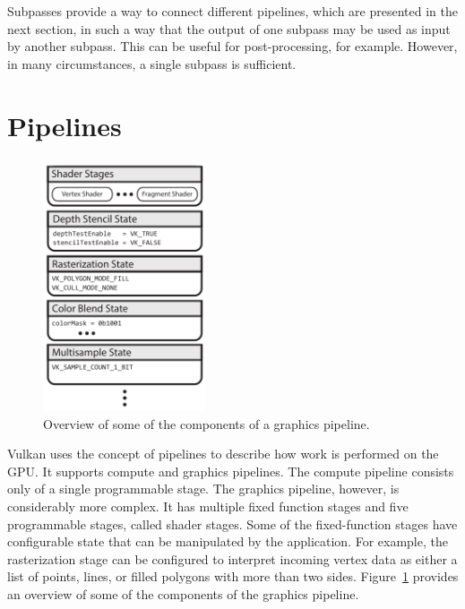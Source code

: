     Subpasses provide a way to connect different pipelines, which are presented in the next section, in such a way that the output of one subpass may be used as input by another subpass.
    This can be useful for post-processing, for example.
    However, in many circumstances, a single subpass is sufficient.

  \section{Pipelines}
  \label{sec:Pipelines}

    \begin{figure}
      \label{fig:GraphicsPipeline}
      \centering
      \includegraphics[width=0.43\textwidth]{Main/Images/GraphicsPipeline}
      \caption{Overview of some of the components of a graphics pipeline.}
    \end{figure}

    Vulkan uses the concept of pipelines to describe how work is performed on the GPU.
    It supports compute and graphics pipelines.
    The compute pipeline consists only of a single programmable stage.
    The graphics pipeline, however, is considerably more complex.
    It has multiple fixed function stages and five programmable stages, called shader stages.
    Some of the fixed-function stages have configurable state that can be manipulated by the \gls{application}.
    For example, the rasterization stage can be configured to interpret incoming vertex data as either a list of points, lines, or filled polygons with more than two sides.
    Figure~\ref{fig:GraphicsPipeline} provides an overview of some of the components of the graphics pipeline.

